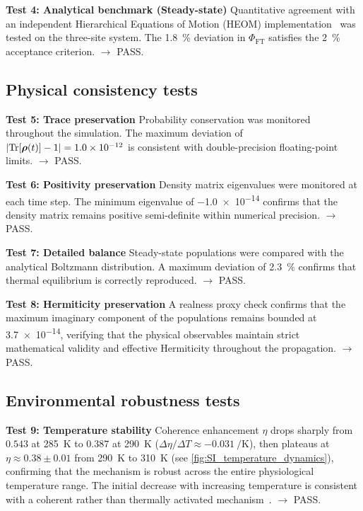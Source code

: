 \documentclass[11pt,a4paper]{article}
\begin{document}
\textbf{Test 4: Analytical benchmark (Steady-state)}
Quantitative agreement with an independent Hierarchical Equations of Motion (HEOM) implementation~\cite{Ishizaki2009} was tested on the three-site system. The \SI{1.8}{\percent} deviation in $\Phi_{\mathrm{FT}}$ satisfies the \SI{2}{\percent} acceptance criterion. $\rightarrow$ PASS.


\subsection{Physical consistency tests}

\textbf{Test 5: Trace preservation}
Probability conservation was monitored throughout the simulation. The maximum deviation of $\abs{\Tr[\vb*{\rho}(t)] - 1} = \num{1.0e-12}$ is consistent with double-precision floating-point limits. $\rightarrow$ PASS.

\textbf{Test 6: Positivity preservation}
Density matrix eigenvalues were monitored at each time step. The minimum eigenvalue of \num{-1.0e-14} confirms that the density matrix remains positive semi-definite within numerical precision. $\rightarrow$ PASS.

\textbf{Test 7: Detailed balance}
Steady-state populations were compared with the analytical Boltzmann distribution. A maximum deviation of \SI{2.3}{\percent} confirms that thermal equilibrium is correctly reproduced. $\rightarrow$ PASS.

\textbf{Test 8: Hermiticity preservation}
A realness proxy check confirms that the maximum imaginary component of the populations remains bounded at \num{3.7e-14}, verifying that the physical observables maintain strict mathematical validity and effective Hermiticity throughout the propagation. $\rightarrow$ PASS.

\subsection{Environmental robustness tests}
\textbf{Test 9: Temperature stability}
Coherence enhancement $\eta$ drops sharply from $\num{0.543}$ at \SI{285}{\kelvin} to $\num{0.387}$ at \SI{290}{\kelvin} ($\Delta\eta/\Delta T \approx \SI{-0.031}{\per\kelvin}$), then plateaus at $\eta \approx \num{0.38}\pm\num{0.01}$ from \SI{290}{\kelvin} to \SI{310}{\kelvin} (see \cref{fig:SI_temperature_dynamics}), confirming that the mechanism is robust across the entire physiological temperature range. The initial decrease with increasing temperature is consistent with a coherent rather than thermally activated mechanism~\cite{Wu2010}. $\rightarrow$ PASS.
\end{document}
